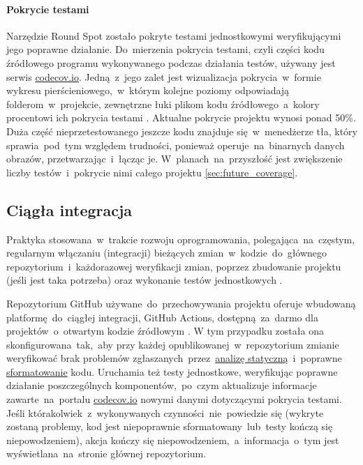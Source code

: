 \paragraph{Pokrycie testami}
\label{par:test_coverage}
Narzędzie Round Spot zostało pokryte testami jednostkowymi weryfikującymi jego poprawne działanie. Do~mierzenia pokrycia testami, czyli części kodu źródłowego programu wykonywanego podczas działania testów, używany jest serwis \href{https://codecov.io/}{codecov.io}. Jedną~z~jego zalet jest wizualizacja pokrycia~w~formie wykresu pierścieniowego,~w~którym kolejne poziomy odpowiadają folderom~w~projekcie, zewnętrzne łuki plikom kodu źródłowego~a~kolory procentowi ich pokrycia testami \cite{RS_Coverage}. Aktualne pokrycie projektu wynosi ponad 50\%. Duża część nieprzetestowanego jeszcze kodu znajduje się~w~menedżerze tła, który sprawia~pod~tym względem trudności, ponieważ operuje~na~binarnych danych obrazów, przetwarzając~i~łącząc je. W~planach~na~przyszłość jest zwiększenie liczby testów~i~pokrycie nimi całego projektu \ref{sec:future_coverage}.

\bigskip
{}

\subsection{Ciągła integracja}
\label{sec:rs_ci}
Praktyka stosowana~w~trakcie rozwoju oprogramowania, polegająca~na~częstym, regularnym włączaniu (integracji) bieżących zmian~w~kodzie~do~głównego repozytorium~i~każdorazowej weryfikacji zmian, poprzez zbudowanie projektu (jeśli jest taka potrzeba) oraz wykonanie testów jednostkowych \cite{CI_definition}.

Repozytorium GitHub używane~do~przechowywania projektu oferuje wbudowaną platformę~do~ciągłej integracji, GitHub Actions, dostępną~za~darmo dla projektów~o~otwartym kodzie źródłowym \cite{RoundSpot_Actions}. W tym przypadku została ona skonfigurowana~tak,~aby przy każdej opublikowanej~w~repozytorium zmianie weryfikować brak problemów zgłaszanych~przez~\hyperref[par:static_analysis]{analizę statyczną}~i~poprawne \hyperref[par:dart_format]{sformatowanie} kodu. Uruchamia też testy jednostkowe, weryfikując poprawne działanie poszczególnych komponentów,~po~czym aktualizuje informacje zawarte~na~portalu \href{https://codecov.io/}{codecov.io} \cite{RS_Coverage} nowymi danymi dotyczącymi pokrycia testami. Jeśli którakolwiek~z~wykonywanych czynności~nie~powiedzie się (wykryte zostaną problemy, kod jest niepoprawnie sformatowany~lub~testy kończą się niepowodzeniem), akcja kończy się niepowodzeniem,~a~informacja~o~tym jest wyświetlana~na~stronie głównej repozytorium.
